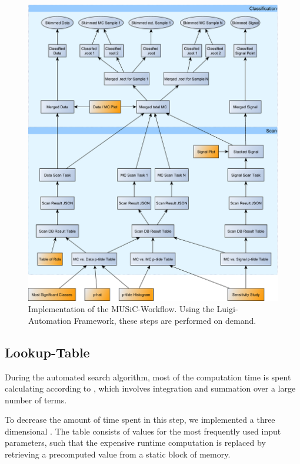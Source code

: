\begin{figure}
    \centering
    \includegraphics[width=\textwidth]{../music-workflow}
    \vspace{0.5em}
    \caption{Implementation of the MUSiC-Workflow. Using the Luigi-Automation Framework, these steps are performed on demand.}
    \label{fig:music_workflow}
\end{figure}


\subsection{Lookup-Table}
During the automated search algorithm, most of the computation time is spent calculating \TS according to , which involves integration and summation over a large number of terms.

To decrease the amount of time spent in this step, we implemented a three dimensional . The table consists of \TS values for the most frequently used input parameters, such that the expensive runtime computation is replaced by retrieving a precomputed value from a static block of memory.

